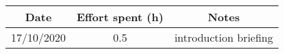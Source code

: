 \documentclass[../../main.tex]{subfiles}
\begin{document}
\begin{center}
    \begin{tabular}{|c| |c| |c|} 
        \hline
        Date & Effort spent (h) & Notes\\ [0.5ex] 
        \hline\hline
        17/10/2020 & 0.5 & introduction briefing\\ 
        \hline
    \end{tabular}
\end{center}
\end{document}
